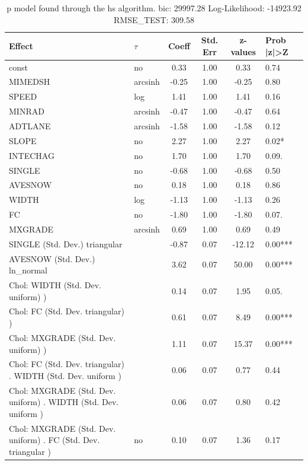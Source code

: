 \begin{table}
	\caption{p model found through the hs algorithm. bic: 29997.28 Log-Likelihood: -14923.92 RMSE_TEST: 309.58}
	\begin{center}
		\begin{tabular}{|l|l|c|c|c|l|}
			\hline
			Effect & $\tau$ & Coeff & Std. Err & z-values & Prob |z|>Z \\
			\hline
			const & no & 0.33 & 1.00 & 0.33 & 0.74 \\
			\hline
			MIMEDSH & arcsinh & -0.25 & 1.00 & -0.25 & 0.80 \\
			\hline
			SPEED & log & 1.41 & 1.00 & 1.41 & 0.16 \\
			\hline
			MINRAD & arcsinh & -0.47 & 1.00 & -0.47 & 0.64 \\
			\hline
			ADTLANE & arcsinh & -1.58 & 1.00 & -1.58 & 0.12 \\
			\hline
			SLOPE & no & 2.27 & 1.00 & 2.27 & 0.02* \\
			\hline
			INTECHAG & no & 1.70 & 1.00 & 1.70 & 0.09. \\
			\hline
			SINGLE & no & -0.68 & 1.00 & -0.68 & 0.50 \\
			\hline
			AVESNOW & no & 0.18 & 1.00 & 0.18 & 0.86 \\
			\hline
			WIDTH & log & -1.13 & 1.00 & -1.13 & 0.26 \\
			\hline
			FC & no & -1.80 & 1.00 & -1.80 & 0.07. \\
			\hline
			MXGRADE & arcsinh & 0.69 & 1.00 & 0.69 & 0.49 \\
			\hline
			SINGLE (Std. Dev.) triangular &  & -0.87 & 0.07 & -12.12 & 0.00*** \\
			\hline
			AVESNOW (Std. Dev.) ln_normal &  & 3.62 & 0.07 & 50.00 & 0.00*** \\
			\hline
			 Chol: WIDTH (Std. Dev. uniform) ) &  & 0.14 & 0.07 & 1.95 & 0.05. \\
			\hline
			 Chol: FC (Std. Dev. triangular) ) &  & 0.61 & 0.07 & 8.49 & 0.00*** \\
			\hline
			 Chol: MXGRADE (Std. Dev. uniform) ) &  & 1.11 & 0.07 & 15.37 & 0.00*** \\
			\hline
			 Chol: FC (Std. Dev. triangular) . WIDTH (Std. Dev.   uniform ) &  & 0.06 & 0.07 & 0.77 & 0.44 \\
			\hline
			 Chol: MXGRADE (Std. Dev. uniform) . WIDTH (Std. Dev.   uniform ) &  & 0.06 & 0.07 & 0.80 & 0.42 \\
			\hline
			 Chol: MXGRADE (Std. Dev. uniform) . FC (Std. Dev.   triangular ) & no & 0.10 & 0.07 & 1.36 & 0.17 \\

\end{tabular}
\end{center}
\end{table}
